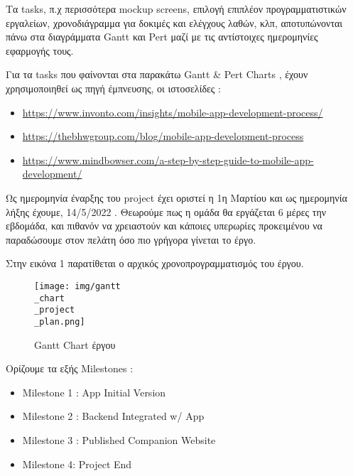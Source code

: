 \documentclass{../ol-softwaremanual}
\begin{document}
	Τα \en tasks, \gr π.χ περισσότερα \en mockup screens\gr, επιλογή επιπλέον προγραμματιστικών εργαλείων,  χρονοδιάγραμμα για δοκιμές και ελέγχους λαθών, κλπ, αποτυπώνονται πάνω στα διαγράμματα \en Gantt \gr και \en Pert \gr μαζί με τις αντίστοιχες ημερομηνίες εφαρμογής τους. \break
	
	Για τα \en tasks \gr που φαίνονται στα παρακάτω \en Gantt \& Pert Charts \gr, έχουν χρησιμοποιηθεί ως πηγή έμπνευσης, οι ιστοσελίδες : 
	
	\begin{itemize}
		\item \en \url{https://www.invonto.com/insights/mobile-app-development-process/}
		\item \en \url{https://thebhwgroup.com/blog/mobile-app-development-process}
		\item \en \url{https://www.mindbowser.com/a-step-by-step-guide-to-mobile-app-development/}
	\end{itemize}
	\vspace{5pt}
	
	Ως ημερομηνία έναρξης του \en project \gr έχει οριστεί η 1η Μαρτίου και ως ημερομηνία λήξης έχουμε, 14/5/2022 . Θεωρούμε πως η ομάδα θα εργάζεται 6 μέρες την εβδομάδα, και πιθανόν να χρειαστούν και κάποιες υπερωρίες προκειμένου να παραδώσουμε στον πελάτη όσο πιο γρήγορα γίνεται το έργο. \\
	
	\newpage
	
	Στην εικόνα 1 παρατίθεται ο αρχικός χρονοπρογραμματισμός του έργου.
	
	\vspace{10pt}
	
	\vspace{10pt}
	\flushleft
	
	\begin{figure}[htbp!]
		
		\texttt{[image: img/gantt\\\_chart\\\_project\\\_plan.png]}
		\caption{\en Gantt Chart \gr έργου}
		
		
	\end{figure}
	
	\vspace{20pt}
Ορίζουμε τα εξής \en Milestones \gr :

\begin{itemize}
	\item \en Milestone 1 : App Initial Version
	\item \en Milestone 2 : Backend Integrated w/ App
	\item \en Milestone 3 : Published Companion Website
	\item \en Milestone 4: Project End
\end{itemize}
	
\end{document}
